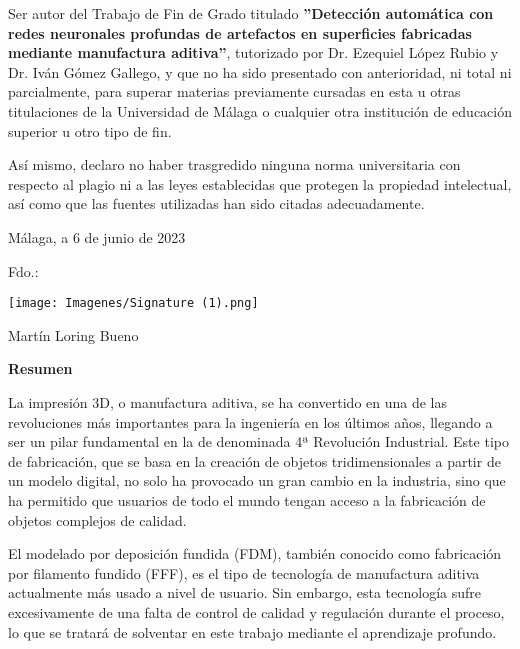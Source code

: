 \documentclass{report}
\begin{document}
Ser autor del Trabajo de Fin de Grado titulado \textbf{''Detección automática con redes neuronales profundas de artefactos en superficies fabricadas mediante
manufactura aditiva''}, tutorizado por Dr. Ezequiel López Rubio y Dr. Iván Gómez Gallego, y que no ha sido presentado con anterioridad, ni total ni parcialmente, para superar materias previamente cursadas en esta u otras titulaciones de la Universidad de Málaga o cualquier otra institución de educación superior u otro tipo de fin. 

Así mismo, declaro no haber trasgredido ninguna norma universitaria con respecto al plagio ni a las leyes establecidas que protegen la propiedad intelectual, así como que las fuentes utilizadas han sido citadas adecuadamente.

\begin{flushright}
Málaga, a 6 de junio de 2023

    Fdo.:
    
    \begin{minipage}[b]{0.23\linewidth}
     \texttt{[image: Imagenes/Signature (1).png]} 
    \end{minipage}
    
    Martín Loring Bueno
    
\end{flushright}




\newpage
\thispagestyle{empty}
\begin{center}
    {\huge  \textbf{Resumen} \par}
\end{center}


La impresión 3D, o manufactura aditiva, se ha convertido en una de las revoluciones más importantes para la ingeniería en los últimos años, llegando a ser un pilar fundamental en la de denominada 4ª Revolución Industrial. Este tipo de fabricación, que se basa en la creación de objetos tridimensionales a partir de un modelo digital, no solo ha provocado un gran cambio en la industria, sino que ha permitido que usuarios de todo el mundo tengan acceso a la fabricación de objetos complejos de calidad.

El modelado por deposición fundida (FDM), también conocido como fabricación por filamento fundido (FFF), es el tipo de tecnología de manufactura aditiva actualmente más usado a nivel de usuario. Sin embargo, esta tecnología sufre excesivamente de una falta de control de calidad y regulación durante el proceso, lo que se tratará de solventar en este trabajo mediante el aprendizaje profundo.
\end{document}
